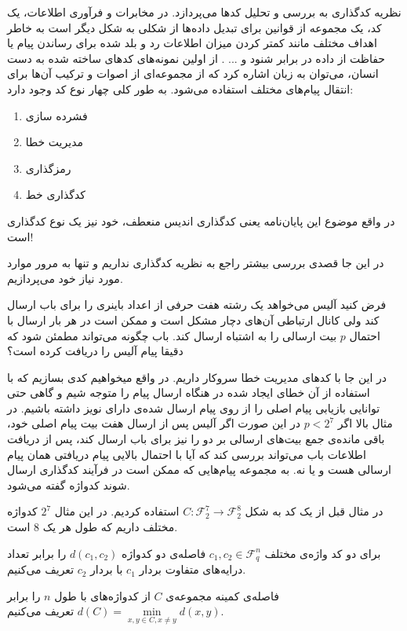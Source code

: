 نظریه کدگذاری به بررسی و تحلیل کد‌ها می‌پردازد. در مخابرات و فرآوری اطلاعات، یک کد، یک مجموعه‌ از قوانین برای تبدیل داده‌ها از شکلی به شکل دیگر است به خاطر اهداف مختلف مانند کمتر کردن میزان اطلاعات رد و بلد شده برای رساندن پیام یا حفاظت از داده در برابر شنود و ... . از اولین نمونه‌های کدهای ساخته شده به دست انسان، می‌توان به زبان اشاره کرد که از مجموعه‌ای از اصوات و ترکیب آن‌ها برای انتقال پیام‌های مختلف استفاده می‌شود. به طور کلی چهار نوع کد وجود دارد:
\begin{enumerate}
	\item
	فشرده سازی
	\item
	مدیریت خطا
	\item
	رمزگذاری
	\item
	کدگذاری خط
\end{enumerate}
\cite{wiki:coding1, wiki:coding2}

در واقع موضوع این پایان‌نامه یعنی کدگذاری اندیس منعطف، خود نیز یک نوع کدگذاری است!

در این جا قصدی بررسی بیشتر راجع به نظریه کدگذاری نداریم و تنها به مرور موارد مورد نیاز خود می‌پردازیم.
\begin{example}
	فرض کنید آلیس می‌خواهد یک رشته هفت حرفی از اعداد باینری را برای باب ارسال کند ولی کانال ارتباطی آن‌های دچار مشکل است و ممکن است در هر بار ارسال با احتمال
	$p$
	بیت ارسالی را به اشتباه ارسال کند. باب چگونه می‌تواند مطمئن شود که دقیقا پیام آلیس را دریافت کرده است؟
	
	در این جا با کدهای مدیریت خطا سروکار داریم. در واقع میخواهیم کدی بسازیم که با استفاده از آن خطای ایجاد شده در هنگاه ارسال پیام را متوجه شیم و گاهی حتی توانایی بازیابی پیام اصلی را از روی پیام ارسال شده‌ی دارای نویز داشته باشیم. در مثال بالا اگر
	$p < 2^7$
	در این صورت اگر آلیس پس از ارسال هفت بیت پیام اصلی خود، باقی مانده‌ی جمع بیت‌های ارسالی بر دو را نیز برای باب ارسال کند، پس از دریافت اطلاعات باب می‌تواند بررسی کند که آیا با احتمال بالایی پیام دریافتی همان پیام ارسالی هست و یا نه. به مجموعه‌ پیام‌هایی که ممکن است در فرآیند کدگذاری ارسال شوند کدواژه گفته می‌شود.
	
	در مثال قبل از یک کد به شکل
	$C: \mathcal{F}_2^7 \rightarrow \mathcal{F}_2^8$
	استفاده کردیم. در این مثال
	$2^7$
	کدواژه مختلف داریم که طول هر یک
	$8$
	است.
\end{example}

\begin{definition}
	برای دو کد واژه‌ی مختلف
	$c_1, c_2 \in \mathcal{F}_q^n$
	فاصله‌ی دو کدواژه
	$d(c_1, c_2)$
	را برابر تعداد درایه‌های متفاوت بردار
	$c_1$
	با بردار
	$c_2$
	تعریف می‌کنیم.
	
	 فاصله‌‌ی کمینه مجموعه‌ی
	$C$
	از کدواژه‌های با طول
	$n$
	 را برابر
	$d(C) = \min\limits_{x, y \in C, x \ne y} d(x, y)$
	تعریف می‌کنیم.
\end{definition}

